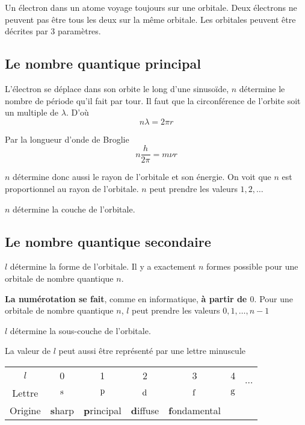 Un électron dans un atome voyage toujours sur une orbitale.
Deux électrons ne peuvent pas être tous les deux sur la même orbitale.
Les orbitales peuvent être décrites par 3 paramètres.

\subsection{Le nombre quantique principal}
L'électron se déplace dans son orbite le long d'une sinusoïde, $n$ détermine le nombre de période qu'il fait par tour.
Il faut que la circonférence de l'orbite soit un multiple de $\lambda$.
D'où
\[ n\lambda = 2\pi r \]

Par la longueur d'onde de Broglie
\[ n \frac{h}{2\pi} = m \nu r \]

$n$ détermine donc aussi le rayon de l'orbitale et son énergie.
On voit que $n$ est proportionnel au rayon de l'orbitale.
$n$ peut prendre les valeurs $1, 2, \ldots$

$n$ détermine la couche de l'orbitale.

\subsection{Le nombre quantique secondaire}
$l$ détermine la forme de l'orbitale.
Il y a exactement $n$ formes possible pour une orbitale de nombre quantique $n$.

{\bf La numérotation se fait}, comme en informatique, {\bf à partir de $0$}.
Pour une orbitale de nombre quantique $n$, $l$ peut prendre les valeurs $0, 1, \ldots, n-1$

$l$ détermine la sous-couche de l'orbitale.

La valeur de $l$ peut aussi être représenté par une lettre minuscule

\begin{center}
	\begin{tabular}{c|cccccc}
		$l$ & 0 & 1 & 2 & 3 & 4 & \multirow{2}{*}{$\cdots$}\\
		\cline{1-6}
		Lettre & $\mathrm{s}$ & $\mathrm{p}$ & $\mathrm{d}$ & $\mathrm{f}$ & $\mathrm{g}$\\
		Origine & {\bf s}harp & {\bf p}rincipal & {\bf d}iffuse & {\bf f}ondamental
	\end{tabular}
\end{center}

